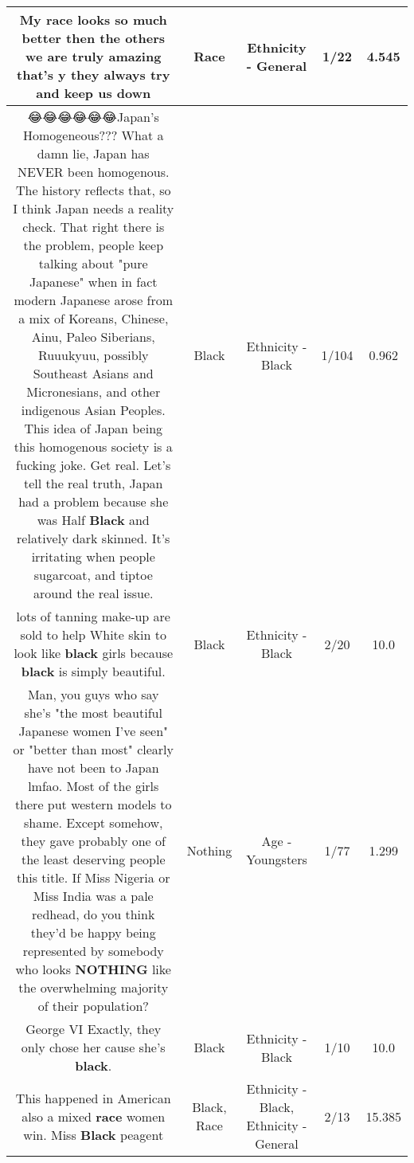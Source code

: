 \documentclass[11pt]{article}
\newlength\mylength
\begin{document}
\begin{center}
\begin{longtable}{|C{.65\mylength}|C{.30\mylength}|C{.12\mylength}|C{.12\mylength}|C{.12\mylength}|}
  \small My \textbf{race} looks so much better then the others we are truly amazing that's y they always try and keep us down\normalsize   & Race & Ethnicity - General & 1/22 & 4.545 \\  \hline
  \small 😂😂😂😂😂😂Japan's Homogeneous??? What a damn lie, Japan has NEVER been homogenous. The history reflects that, so I think Japan needs a reality check. That right there is the problem, people keep talking about "pure Japanese" when in fact modern Japanese arose from a mix of Koreans, Chinese, Ainu, Paleo Siberians, Ruuukyuu, possibly Southeast Asians and Micronesians, and other indigenous Asian Peoples. This idea of Japan being this homogenous society is a fucking joke. Get real. Let's tell the real truth, Japan had a problem because she was Half \textbf{Black} and relatively dark skinned. It's irritating when people sugarcoat, and tiptoe around the real issue.\normalsize   & Black & Ethnicity - Black & 1/104 & 0.962 \\  \hline
  \small lots of tanning make-up are sold to help White skin to look like \textbf{black} girls because \textbf{black} is simply beautiful.\normalsize   & Black & Ethnicity - Black & 2/20 & 10.0 \\  \hline
  \small Man, you guys who say she's "the most beautiful Japanese women I've seen" or "better than most" clearly have not been to Japan lmfao. Most of the girls there put western models to shame. Except somehow, they gave probably one of the least deserving people this title. If Miss Nigeria or Miss India was a pale redhead, do you think they'd be happy being represented by somebody who looks \textbf{NOTHING} like the overwhelming majority of their population?\normalsize   & Nothing & Age - Youngsters & 1/77 & 1.299 \\  \hline
  \small George VI Exactly, they only chose her cause she's \textbf{black}.\normalsize   & Black & Ethnicity - Black & 1/10 & 10.0 \\  \hline
  \small This happened in American also a mixed \textbf{race} women win. Miss \textbf{Black}  peagent\normalsize   & Black, Race & Ethnicity - Black, Ethnicity - General & 2/13 & 15.385 \\  \hline

\end{longtable}
\end{center}
\end{document}
